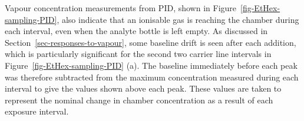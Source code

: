 \documentclass[
  a4paper,
]{scrbook}
\begin{document}
Vapour concentration measurements from PID, shown in
Figure~\ref{fig-EtHex-sampling-PID}, also indicate that an ionisable gas
is reaching the chamber during each interval, even when the analyte
bottle is left empty. As discussed in
Section~\ref{sec-responses-to-vapour}, some baseline drift is seen after
each addition, which is particularly significant for the second two
carrier line intervals in Figure~\ref{fig-EtHex-sampling-PID} (a). The
baseline immediately before each peak was therefore subtracted from the
maximum concentration measured during each interval to give the values
shown above each peak. These values are taken to represent the nominal
change in chamber concentration as a result of each exposure interval.

\begin{figure}

\begin{minipage}[t]{0.11\linewidth}

{\centering 

~

}

\end{minipage}%
%
\begin{minipage}[t]{0.03\linewidth}

{\centering 


}

\end{minipage}%
%
\begin{minipage}[t]{0.01\linewidth}

{\centering 

~

}

\end{minipage}%
%
\begin{minipage}[t]{0.70\linewidth}

{\centering 

\raisebox{-\height}{

}}
\end{minipage}
\end{figure}
\end{document}
